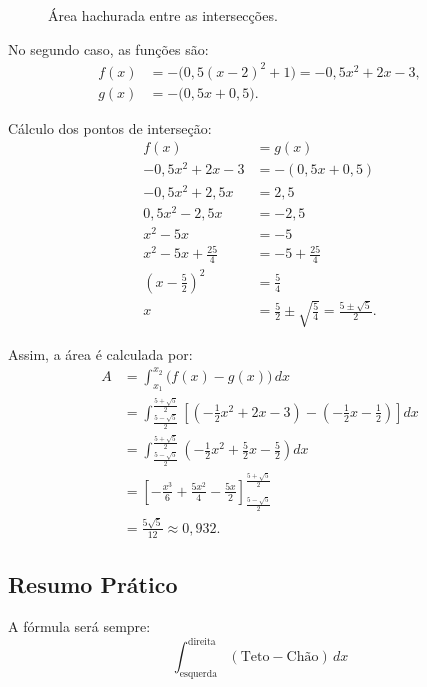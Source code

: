 \begin{exercicio}
\begin{figure}[H]
\caption{Área hachurada entre as intersecções.}
\end{figure}

No segundo caso, as funções são:
\begin{align*}
f(x)&=-\bigl(0{,}5(x-2)^2+1\bigr)=-0{,}5x^2+2x-3,\\
g(x)&=-\bigl(0{,}5x+0{,}5\bigr).
\end{align*}

Cálculo dos pontos de interseção:
\begin{align*}
f(x)&=g(x)\\
-0{,}5x^2+2x-3&=-(0{,}5x+0{,}5)\\
-0{,}5x^2+2{,}5x&=2{,}5\\
0{,}5x^2-2{,}5x&=-2{,}5\\
x^2-5x&=-5\\
x^2-5x+\frac{25}{4}&=-5+\frac{25}{4}\\
\left(x-\frac{5}{2}\right)^2&=\frac{5}{4}\\
x&=\frac{5}{2}\pm\sqrt{\frac{5}{4}}=\frac{5\pm\sqrt5}{2}.
\end{align*}

Assim, a área é calculada por:
\begin{align*}
A
&=\int_{x_1}^{x_2}\bigl(f(x)-g(x)\bigr)\,dx\\
&=\int_{\frac{5-\sqrt5}{2}}^{\frac{5+\sqrt5}{2}}
\left[\left(-\frac12x^2+2x-3\right)-\left(-\frac12x-\frac12\right)\right]dx\\
&=\int_{\frac{5-\sqrt5}{2}}^{\frac{5+\sqrt5}{2}}
\left(-\frac12x^2+\frac52x-\frac52\right)dx\\
&=\left[-\frac{x^3}{6}+\frac{5x^2}{4}-\frac{5x}{2}\right]_{\frac{5-\sqrt5}{2}}^{\frac{5+\sqrt5}{2}}\\
&=\frac{5\sqrt5}{12}\approx 0{,}932.
\end{align*}

\subsection*{Resumo Prático}
A fórmula será sempre:
\[
  \int_{\text{esquerda}}^{\text{direita}} (\text{Teto} - \text{Chão}) \,dx
\]

\end{exercicio}

